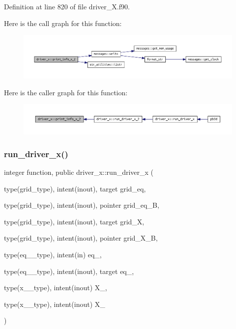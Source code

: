 Definition at line 820 of file driver\+\_\+\+X.\+f90.

Here is the call graph for this function\+:
\nopagebreak
\begin{figure}[H]
\begin{center}
\leavevmode
\includegraphics[width=350pt]{namespacedriver__x_aca49d362e21df044e21d5ba4b2599cf4_cgraph}
\end{center}
\end{figure}
Here is the caller graph for this function\+:
\nopagebreak
\begin{figure}[H]
\begin{center}
\leavevmode
\includegraphics[width=350pt]{namespacedriver__x_aca49d362e21df044e21d5ba4b2599cf4_icgraph}
\end{center}
\end{figure}
\mbox{\label{namespacedriver__x_ada3d72a0929daaa5e3da585246d62281}} 
\subsubsection{\texorpdfstring{run\+\_\+driver\+\_\+x()}{run\_driver\_x()}}
{\footnotesize\ttfamily integer function, public driver\+\_\+x\+::run\+\_\+driver\+\_\+x (\begin{DoxyParamCaption}\item[{type(grid\+\_\+type), intent(inout), target}]{grid\+\_\+eq,  }\item[{type(grid\+\_\+type), intent(inout), pointer}]{grid\+\_\+eq\+\_\+B,  }\item[{type(grid\+\_\+type), intent(inout), target}]{grid\+\_\+X,  }\item[{type(grid\+\_\+type), intent(inout), pointer}]{grid\+\_\+\+X\+\_\+B,  }\item[{type(eq\+\_\+1\+\_\+type), intent(in)}]{eq\+\_,  }\item[{type(eq\+\_\+2\+\_\+type), intent(inout), target}]{eq\+\_,  }\item[{type(x\+\_\+1\+\_\+type), intent(inout)}]{X\+\_,  }\item[{type(x\+\_\+2\+\_\+type), intent(inout)}]{X\+\_ }\end{DoxyParamCaption})}



